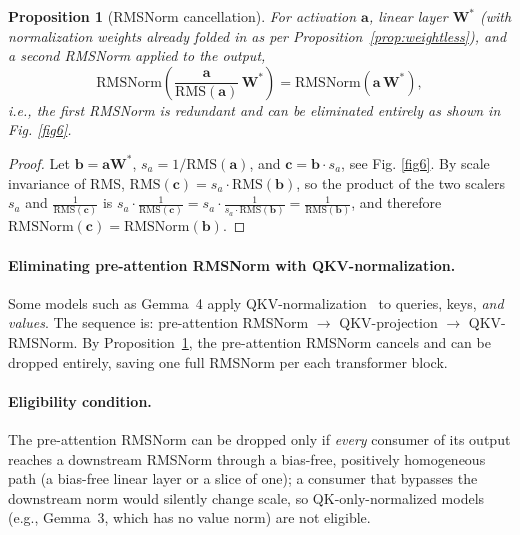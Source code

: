 \documentclass{article}
\newtheorem{proposition}{Proposition}
\begin{document}
\begin{proposition}[RMSNorm cancellation]\label{prop:rms-cancel}
For activation $\mathbf{a}$, linear layer $\mathbf{W}^*$ (with normalization weights
already folded in as per Proposition~\ref{prop:weightless}), and a second RMSNorm
applied to the output,
\[
  \mathrm{RMSNorm}\!\left(\frac{\mathbf{a}}{\mathrm{RMS}(\mathbf{a})}\,\mathbf{W}^*\right)
  = \mathrm{RMSNorm}\!\left(\mathbf{a}\,\mathbf{W}^*\right),
\]
i.e., the first RMSNorm is redundant and can be eliminated entirely as shown in Fig. \ref{fig6}.
\end{proposition}
\begin{proof}
Let $\mathbf{b} = \mathbf{a}\mathbf{W}^*$, $s_a = 1/\mathrm{RMS}(\mathbf{a})$, and
$\mathbf{c} = \mathbf{b} \cdot s_a$, see Fig. \ref{fig6}.  By scale invariance of RMS,
$\mathrm{RMS}(\mathbf{c}) = s_a \cdot \mathrm{RMS}(\mathbf{b})$, so the product of the two scalers $s_a$
and $\frac{1}{\mathrm{RMS}(\mathbf{c})}$ is $s_a \cdot \frac{1}{\mathrm{RMS}(\mathbf{c})}
= s_a \cdot \frac{1}{s_a \cdot \mathrm{RMS}(\mathbf{b})} = \frac{1}{\mathrm{RMS}(\mathbf{b})}$,
and therefore $\mathrm{RMSNorm}(\mathbf{c}) = \mathrm{RMSNorm}(\mathbf{b})$.
\end{proof}
\paragraph{Eliminating pre-attention RMSNorm with QKV-normalization.}
Some models such as Gemma~4 \citep{gemma4} apply QKV-normalization~\citep{qkv-norm} to
queries, keys, \emph{and values}. The sequence is:
pre-attention RMSNorm $\to$ QKV-projection $\to$ QKV-RMSNorm.
By Proposition~\ref{prop:rms-cancel}, the pre-attention RMSNorm cancels and can be
dropped entirely, saving one full RMSNorm per each transformer block.

\paragraph{Eligibility condition.}
The pre-attention RMSNorm can be dropped only if \emph{every} consumer of its output
reaches a downstream RMSNorm through a bias-free, positively homogeneous path (a
bias-free linear layer or a slice of one); a consumer that bypasses the downstream norm
would silently change scale, so QK-only-normalized models (e.g., Gemma~3, which has no
value norm) are not eligible.
\end{document}

